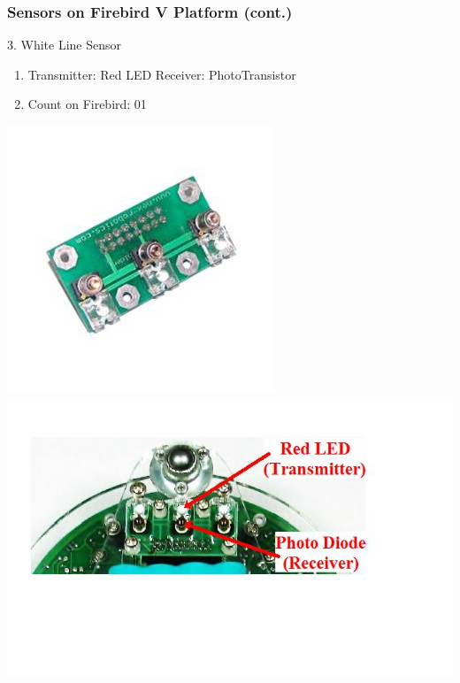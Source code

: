 \documentclass[10pt,red]{beamer}
\begin{document}
\begin{frame}
	\frametitle{Sensors on Firebird V Platform (cont.)} 
	3. White Line Sensor	\pause
		\vfill
		\begin{minipage}[c]{0.5\textwidth}
			\begin{enumerate}
				\item <+-|alert@+> Transmitter: Red LED \qquad Receiver: PhotoTransistor \\[10pt]
				\item <+-|alert@+> Count on Firebird: 01
			\end{enumerate}
		\end{minipage}
		\hfill
		\begin{minipage}[c]{0.4\textwidth}
			\includegraphics[width=0.8\linewidth]{line_sensor}
		\vfill
			\includegraphics[width=\linewidth]{line_sensor_on_fb}
		\end{minipage}	
\end{frame}	
\end{document}
